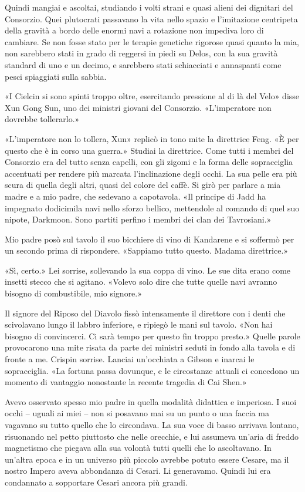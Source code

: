 Quindi mangiai e ascoltai, studiando i volti strani e quasi alieni dei
dignitari del Consorzio. Quei plutocrati passavano la vita nello spazio
e l'imitazione centripeta della gravità a bordo delle enormi navi a
rotazione non impediva loro di cambiare. Se non fosse stato per le
terapie genetiche rigorose quasi quanto la mia, non sarebbero stati in
grado di reggersi in piedi su Delos, con la sua gravità standard di uno
e un decimo, e sarebbero stati schiacciati e annaspanti come pesci
spiaggiati sulla sabbia.

«I Cielcin si sono spinti troppo oltre, esercitando pressione al di là
del Velo» disse Xun Gong Sun, uno dei ministri giovani del Consorzio.
«L'imperatore non dovrebbe tollerarlo.»

«L'imperatore non lo tollera, Xun» replicò in tono mite la direttrice
Feng. «È per questo che è in corso una guerra.» Studiai la direttrice.
Come tutti i membri del Consorzio era del tutto senza capelli, con gli
zigomi e la forma delle sopracciglia accentuati per rendere più marcata
l'inclinazione degli occhi. La sua pelle era più scura di quella degli
altri, quasi del colore del caffè. Si girò per parlare a mia madre e a
mio padre, che sedevano a capotavola. «Il principe di Jadd ha impegnato
dodicimila navi nello sforzo bellico, mettendole al comando di quel suo
nipote, Darkmoon. Sono partiti perfino i membri dei clan dei
Tavrosiani.»

Mio padre posò sul tavolo il suo bicchiere di vino di Kandarene e si
soffermò per un secondo prima di rispondere. «Sappiamo tutto questo.
Madama direttrice.»

«Sì, certo.» Lei sorrise, sollevando la sua coppa di vino. Le sue dita
erano come insetti stecco che si agitano. «Volevo solo dire che tutte
quelle navi avranno bisogno di combustibile, mio signore.»

Il signore del Riposo del Diavolo fissò intensamente il direttore con i
denti che scivolavano lungo il labbro inferiore, e ripiegò le mani sul
tavolo. «Non hai bisogno di convincerci. Ci sarà tempo per questo fin
troppo presto.» Quelle parole provocarono una mite risata da parte dei
ministri seduti in fondo alla tavola e di fronte a me. Crispin sorrise.
Lanciai un'occhiata a Gibson e inarcai le sopracciglia. «La fortuna
passa dovunque, e le circostanze attuali ci concedono un momento di
vantaggio nonostante la recente tragedia di Cai Shen.»

Avevo osservato spesso mio padre in quella modalità didattica e
imperiosa. I suoi occhi -- uguali ai miei -- non si posavano mai su un
punto o una faccia ma vagavano su tutto quello che lo circondava. La sua
voce di basso arrivava lontano, risuonando nel petto piuttosto che nelle
orecchie, e lui assumeva un'aria di freddo magnetismo che piegava alla
sua volontà tutti quelli che lo ascoltavano. In un'altra epoca e in un
universo più piccolo avrebbe potuto essere Cesare, ma il nostro Impero
aveva abbondanza di Cesari. Li generavamo. Quindi lui era condannato a
sopportare Cesari ancora più grandi.

